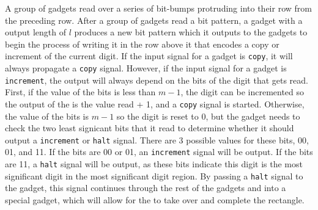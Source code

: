 \subsubsection{\cread}
%
A group of {\cread} gadgets read over a series of bit-bumps protruding into their row from the preceding row.
%
After a group of {\cread} gadgets read a bit pattern, a {\cread} gadget with a output length of $l$ produces a new bit pattern which it outputs to the {\prewarp} gadgets to begin the process of writing it in the row above it that encodes a copy or increment of the current digit.
%
If the input signal for a {\cread} gadget is {\tt copy}, it will always propagate a {\tt copy} signal.
%
However, if the input signal for a {\cread} gadget is {\tt increment}, the output will always depend on the bits of the digit that gets read.
%
First, if the value of the bits is less than $m - 1$, the digit can be incremented so the output of the {\cread} is the value read + 1, and a {\tt copy} signal is started.
%
Otherwise, the value of the bits is $m - 1$ so the digit is reset to 0, but the {\cread} gadget needs to check the two least signicant bits that it read to determine whether it should output a {\tt increment} or {\tt halt} signal.
%
There are 3 possible values for these bits, 00, 01, and 11.
%
If the bits are 00 or 01, an {\tt increment} signal will be output.
%
If the bits are 11, a {\tt halt} signal will be output, as these bits indicate this digit is the most significant digit in the most significant digit region.
%
By passing a {\tt halt} signal to the {\prewarp} gadget, this signal continues through the rest of the {\warpunit} gadgets and into a special {\cwrite} gadget, which will allow for the {\roofunit} to take over and complete the rectangle.
%
